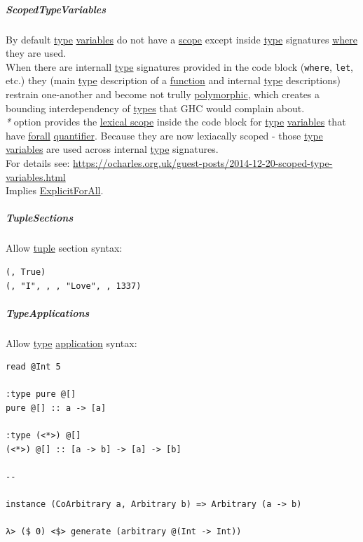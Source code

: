\documentclass[11pt]{article}
\begin{document}
\subparagraph{\label{org1f3d5d9}ScopedTypeVariables}
\label{sec:orga193a53}
By default \hyperref[org4fbaeb8]{type} \hyperref[orgd3f3ade]{variables} do not have a \hyperref[orga4eed83]{scope} except inside \hyperref[org4fbaeb8]{type} signatures \hyperref[orgefd1ecd]{where} they are used.\\

When there are internall \hyperref[org4fbaeb8]{type} signatures provided in the code block (\texttt{where}, \texttt{let}, etc.) they (main \hyperref[org4fbaeb8]{type} description of a \hyperref[orgeb5cddb]{function} and internal \hyperref[org4fbaeb8]{type} descriptions) restrain one-another and become not trully \hyperref[org84d7fee]{polymorphic}, which creates a bounding interdependency of \hyperref[org3927fd9]{types} that GHC would complain about.\\

\emph{*} option provides the \hyperref[org8fb06f5]{lexical scope} inside the code block for \hyperref[org4fbaeb8]{type} \hyperref[orgd3f3ade]{variables} that have \hyperref[org746fdae]{forall} \hyperref[org7158dde]{quantifier}. Because they are now lexiacally scoped - those \hyperref[org4fbaeb8]{type} \hyperref[orgd3f3ade]{variables} are used across internal \hyperref[org4fbaeb8]{type} signatures.\\

For details see: \url{https://ocharles.org.uk/guest-posts/2014-12-20-scoped-type-variables.html}\\

Implies \hyperref[org7f703ef]{ExplicitForAll}.\\

\subparagraph{\label{org025ff42}TupleSections}
\label{sec:org02ae093}
Allow \hyperref[org7c37a79]{tuple} section syntax:\\
\begin{verbatim}
(, True)
(, "I", , , "Love", , 1337)
\end{verbatim}

\subparagraph{\label{orgc6a3716}TypeApplications}
\label{sec:orgd4dfeb2}
Allow \hyperref[org4fbaeb8]{type} \hyperref[orged2f814]{application} syntax:\\
\begin{verbatim}
read @Int 5

:type pure @[]
pure @[] :: a -> [a]

:type (<*>) @[]
(<*>) @[] :: [a -> b] -> [a] -> [b]

--

instance (CoArbitrary a, Arbitrary b) => Arbitrary (a -> b)

λ> ($ 0) <$> generate (arbitrary @(Int -> Int))
\end{verbatim}
\end{document}

